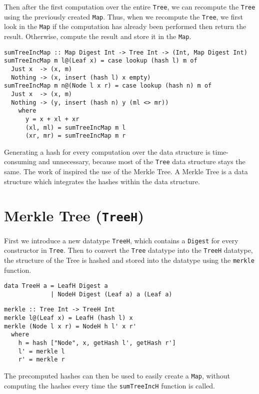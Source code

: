 Then after the first computation over the entire \texttt{Tree}, we can recompute the \texttt{Tree} using the previously created \texttt{Map}. Thus, when we recompute the \texttt{Tree}, we first look in the \texttt{Map} if the computation has already been performed then return the result. Otherwise, compute the result and store it in the \texttt{Map}.

\begin{verbatim}
sumTreeIncMap :: Map Digest Int -> Tree Int -> (Int, Map Digest Int)
sumTreeIncMap m l@(Leaf x) = case lookup (hash l) m of
  Just x  -> (x, m) 
  Nothing -> (x, insert (hash l) x empty)
sumTreeIncMap m n@(Node l x r) = case lookup (hash n) m of
  Just x  -> (x, m)
  Nothing -> (y, insert (hash n) y (ml <> mr))
    where
      y = x + xl + xr
      (xl, ml) = sumTreeIncMap m l
      (xr, mr) = sumTreeIncMap m r
\end{verbatim}

Generating a hash for every computation over the data structure is time-consuming and unnecessary, because most of the \texttt{Tree} data structure stays the same. The work of \citeauthor{miraldo2019efficient}\cite{miraldo2019efficient} inspired the use of the Merkle Tree. A Merkle Tree is a data structure which integrates the hashes within the data structure.

\section{Merkle Tree (\texttt{TreeH})}
First we introduce a new datatype \texttt{TreeH}, which contains a \texttt{Digest} for every constructor in \texttt{Tree}. Then to convert the \texttt{Tree} datatype into the \texttt{TreeH} datatype, the structure of the Tree is hashed and stored into the datatype using the \texttt{merkle} function.

\begin{verbatim}
data TreeH a = LeafH Digest a
             | NodeH Digest (Leaf a) a (Leaf a)
\end{verbatim}

\begin{verbatim}
merkle :: Tree Int -> TreeH Int
merkle l@(Leaf x) = LeafH (hash l) x
merkle (Node l x r) = NodeH h l' x r'
  where
    h = hash ["Node", x, getHash l', getHash r']
    l' = merkle l
    r' = merkle r
\end{verbatim}

The precomputed hashes can then be used to easily create a \texttt{Map}, without computing the hashes every time the \texttt{sumTreeIncH} function is called.

